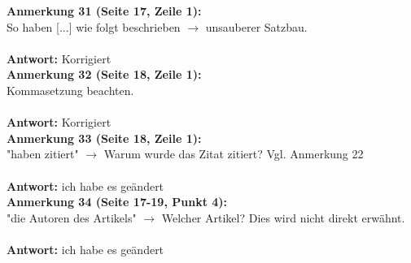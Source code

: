 \documentclass[a4paper,12pt]{book}
\begin{document}
\noindent
\textbf{Anmerkung 31 (Seite 17, Zeile 1):}\\
So haben [...] wie folgt beschrieben $\rightarrow$ unsauberer Satzbau. \\ \\
\textbf{Antwort:} Korrigiert
\\

\noindent
\textbf{Anmerkung 32 (Seite 18, Zeile 1):}\\
Kommasetzung beachten. \\ \\
\textbf{Antwort:} Korrigiert
\\

\noindent
\textbf{Anmerkung 33 (Seite 18, Zeile 1):}\\
"haben zitiert" $\rightarrow$ Warum wurde das Zitat zitiert? Vgl. Anmerkung 22 \\ \\
\textbf{Antwort:} ich habe es geändert
\\

\noindent
\textbf{Anmerkung 34 (Seite 17-19, Punkt 4):}\\
"die Autoren des Artikels" $\rightarrow$ Welcher Artikel? Dies wird nicht direkt erwähnt. \\ \\
\textbf{Antwort:} ich habe es geändert
\\
\end{document}
